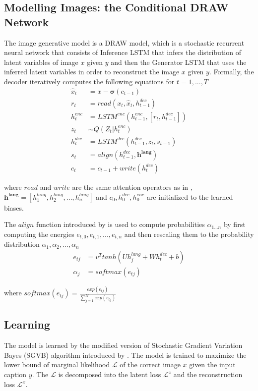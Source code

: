 \documentclass{article} %
\newcommand{\sigmoid}{\boldsymbol{\sigma}}
\newcommand{\hlang}{h^{lang}}
\newcommand{\hlangall}{\boldsymbol{h^{lang}}}
\newcommand{\hdec}{h^{dec}}
\newcommand{\henc}{h^{enc}}
\newcommand{\readop}{\mathit{read}}
\newcommand{\writeop}{\mathit{write}}
\newcommand{\encoder}{\mathit{LSTM}^{enc}}
\newcommand{\decoder}{\mathit{LSTM}^{dec}}
\newcommand{\canv}{c}
\newcommand{\lat}{z}
\newcommand{\Lat}{Z}
\newcommand{\post}{Q}
\newcommand{\loss}{\mathcal{L}}
\newcommand{\lloss}{\mathcal{L}^{z}}
\newcommand{\rloss}{\mathcal{L}^{x}}
\begin{document}
\subsection{Modelling Images: the Conditional DRAW Network}

The image generative model is a DRAW model, which is a stochastic recurrent neural network that consists of Inference LSTM that infers the distribution of latent variables of image $x$ given $y$ and then the Generator LSTM that uses the inferred latent variables in order to reconstruct the image $x$ given $y$. Formally, the decoder iteratively computes the following equations for $t=1,...,T$
\begin{align}
\label{eq:x_hat}
\hat{x}_t &= x-\sigmoid(\canv_{t-1})\\
\label{eq:read}
r_t &= \readop(x_t, \hat{x}_t, \hdec_{t-1})\\
\henc_t &= \encoder(\henc_{t-1}, [r_t, \hdec_{t-1}])\\
\lat_t &\sim \post(\Lat_t|\henc_t)\\
\hdec_t &= \decoder(\hdec_{t-1}, z_t, s_{t-1})\\
s_{t} &= align(\hdec_{t-1}, \hlangall)\\
\label{eq:write}
\canv_t &= \canv_{t-1} + \writeop(\hdec_t)
\end{align}

where $\readop$ and $\writeop$ are the same attention operators as in \citep{gregor_draw}, $\hlangall = [\hlang_{1}, \hlang_{2}, ..., \hlang_{n}]$ and $\canv_{0}, \hdec_{0}, \henc_{0}$ are initialized to the learned biases.

The $align$ function introduced by \cite{bahdanau_mt} is used to compute probabilities $\alpha_{1...n}$ by first computing the energies $e_{t,0}, e_{t,1}, ..., e_{t,n}$ and then rescaling them to the probability distribution $\alpha_{1}, \alpha_{2}, ..., \alpha_{n}$
\begin{align}
e_{tj} &= v^{T}tanh(U\hlang_{j} + W\hdec_{t} + b)\\
\alpha_{j} &= softmax(e_{tj})
\end{align}

where $softmax(e_{tj}) = \frac{exp(e_{tj})}{\sum_{j=1}^{N}exp(e_{tj})}$


\subsection{Learning}

The model is learned by the modified version of Stochastic Gradient Variation Bayes (SGVB) algorithm introduced by \cite{kingma_vae}. The model is trained to maximize the lower bound of marginal likelihood $\loss$ of the correct image $x$ given the input caption $y$. The $\loss$ is decomposed into the latent loss $\lloss$ and the reconstruction loss $\rloss$. 
\end{document}
